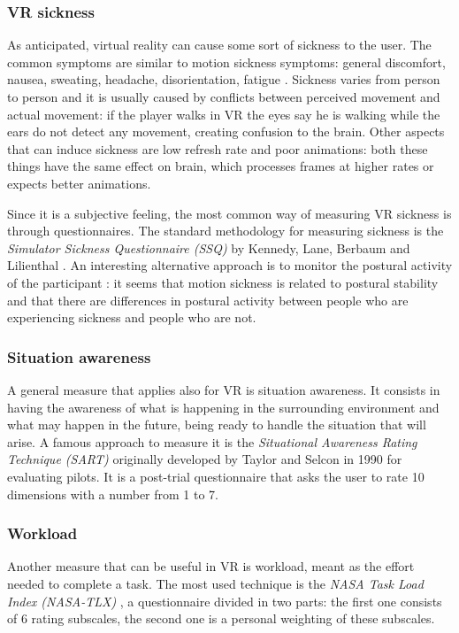 \documentclass[binding=0.6cm,LaM]{sapthesis}
\begin{document}
\subsubsection{VR sickness}
As anticipated, virtual reality can cause some sort of sickness to the user. The common symptoms are similar to motion sickness symptoms: general discomfort, nausea, sweating, headache, disorientation, fatigue \cite{cobb1999virtual}.
Sickness varies from person to person and it is usually caused by conflicts between perceived movement and actual movement: if the player walks in VR the eyes say he is walking while the ears do not detect any movement, creating confusion to the brain. Other aspects that can induce sickness are low refresh rate and poor animations: both these things have the same effect on brain, which processes frames at higher rates or expects better animations.

Since it is a subjective feeling, the most common way of measuring VR sickness is through questionnaires. The standard methodology for measuring sickness is the \textit{Simulator Sickness Questionnaire (SSQ)} by Kennedy, Lane, Berbaum and Lilienthal \cite{kennedy1993simulator}. 
An interesting alternative approach is to monitor the postural activity of the participant \cite{riccio1991ecological}: it seems that motion sickness is related to postural stability and that there are differences in postural activity between people who are experiencing sickness and people who are not.

\subsubsection{Situation awareness}
A general measure that applies also for VR is situation awareness. It consists in having the awareness of what is happening in the surrounding environment and what may happen in the future, being ready to handle the situation that will arise. A famous approach to measure it is the \textit{Situational Awareness Rating Technique (SART)} \cite{selcon1990evaluation} originally developed by Taylor and Selcon in 1990 for evaluating pilots. It is a post-trial questionnaire that asks the user to rate 10 dimensions with a number from 1 to 7.

\subsubsection{Workload}
Another measure that can be useful in VR is workload, meant as the effort needed to complete a task. The most used technique is the
\textit{NASA Task Load Index (NASA-TLX)} \cite{hart1988development}, a questionnaire divided in two parts: the first one consists of 6 rating subscales, the second one is a personal weighting of these subscales.
\end{document}
